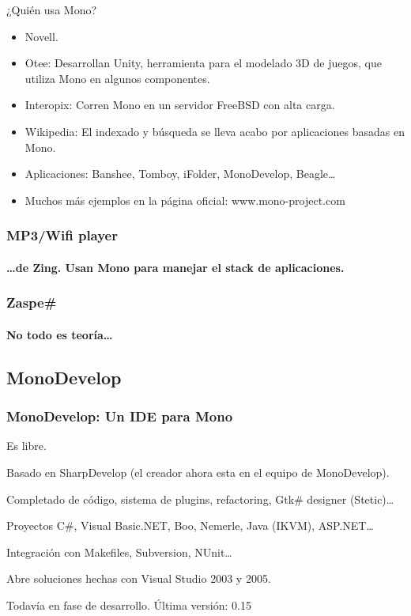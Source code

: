 \documentclass{beamer}
\begin{document}
\begin{frame}{¿Quién usa Mono?}
  \begin{itemize}
    \item Novell.
    \item Otee: Desarrollan Unity, herramienta para el modelado 3D de juegos, que
      utiliza Mono en algunos componentes.
    \item Interopix: Corren Mono en un servidor FreeBSD con alta carga.
    \item Wikipedia: El indexado y búsqueda se lleva acabo por aplicaciones basadas en Mono.
    \item Aplicaciones: Banshee, Tomboy, iFolder, MonoDevelop, Beagle\ldots
    \item Muchos más ejemplos en la página oficial: \alert{www.mono-project.com}
  \end{itemize}
\end{frame}

\begin{frame}[plain]
  \frametitle{MP3/Wifi player}
  \framesubtitle{\ldots de Zing. Usan Mono para manejar el stack de aplicaciones.}

  \begin{centering}
  \end{centering}
\end{frame}

\begin{frame}
  \frametitle{Zaspe\#}
  \framesubtitle{No todo es teoría\ldots}

  \begin{centering}
  \end{centering}
\end{frame}


\subsection{MonoDevelop}

\begin{frame}
  \frametitle{MonoDevelop: Un IDE para Mono}

  \begin{itemize}
    \begin{small}
      \item Es libre.
      \item Basado en SharpDevelop (el creador ahora esta en el equipo de MonoDevelop).
      \item Completado de código, sistema de plugins, refactoring, Gtk\# designer (Stetic)\ldots
      \item Proyectos C\#, Visual Basic.NET, Boo, Nemerle, Java (IKVM), ASP.NET\ldots
      \item Integración con Makefiles, Subversion, NUnit\ldots
      \item Abre soluciones hechas con Visual Studio 2003 y 2005.
      \item \alert{Todavía en fase de desarrollo. Última versión: 0.15}
    \end{small}
  \end{itemize}
\end{frame}
\end{document}
